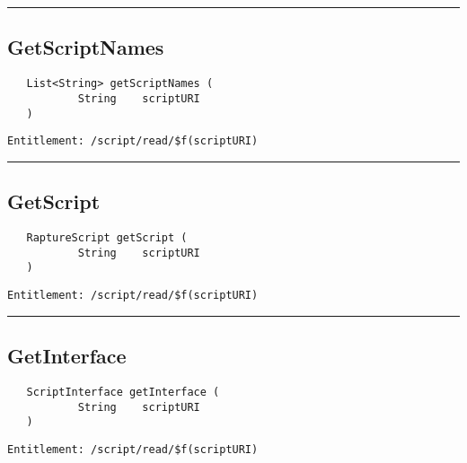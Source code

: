 \rule{12cm}{2pt}
\subsection{GetScriptNames}
\label{Api:GetScriptNames}
\begin{verbatim}
   List<String> getScriptNames (
           String    scriptURI
   )
\end{verbatim}
\begin{Verbatim}[fontsize=\small, formatcom=\color{Maroon}]
  Entitlement: /script/read/$f(scriptURI)
\end{Verbatim}



\rule{12cm}{2pt}
\subsection{GetScript}
\label{Api:GetScript}
\begin{verbatim}
   RaptureScript getScript (
           String    scriptURI
   )
\end{verbatim}
\begin{Verbatim}[fontsize=\small, formatcom=\color{Maroon}]
  Entitlement: /script/read/$f(scriptURI)
\end{Verbatim}



\rule{12cm}{2pt}
\subsection{GetInterface}
\label{Api:GetInterface}
\begin{verbatim}
   ScriptInterface getInterface (
           String    scriptURI
   )
\end{verbatim}
\begin{Verbatim}[fontsize=\small, formatcom=\color{Maroon}]
  Entitlement: /script/read/$f(scriptURI)
\end{Verbatim}



